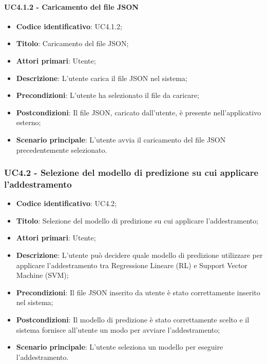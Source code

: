 \paragraph{UC4.1.2 - Caricamento del file JSON}
\begin{itemize}
	\item \textbf{Codice identificativo}: UC4.1.2;
	\item \textbf{Titolo}: Caricamento del file JSON;
	\item \textbf{Attori primari}: Utente;
	\item \textbf{Descrizione}: L'utente carica il file JSON nel sistema;
	\item \textbf{Precondizioni}: L'utente ha selezionato il file da caricare;
	\item \textbf{Postcondizioni}: Il file JSON, caricato dall'utente, è presente nell'applicativo esterno;
	\item \textbf{Scenario principale}: L'utente avvia il caricamento del file JSON precedentemente selezionato.
\end{itemize}

\subsubsection{UC4.2 - Selezione del modello di predizione su cui applicare l'addestramento}
\begin{itemize}
    \item \textbf{Codice identificativo}: UC4.2;
    \item \textbf{Titolo}: Selezione del modello di predizione su cui applicare l'addestramento;
    \item \textbf{Attori primari}: Utente;
    \item \textbf{Descrizione}: L'utente può decidere quale modello di predizione utilizzare per applicare l'addestramento tra Regressione Lineare (RL\glo) e Support Vector Machine (SVM\glo);
    \item \textbf{Precondizioni}: Il file JSON inserito da utente è stato correttamente inserito nel sistema;
    \item \textbf{Postcondizioni}: Il modello di predizione è stato correttamente scelto e il sistema fornisce all'utente un modo per avviare l'addestramento;
    \item \textbf{Scenario principale}: L'utente seleziona un modello per eseguire l'addestramento.
    
\end{itemize}


